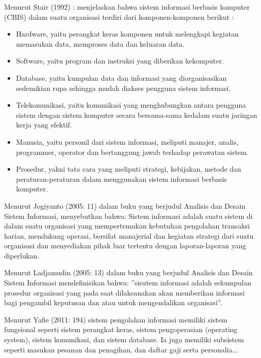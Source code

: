 \documentclass{jtetiproposalskripsi}
\begin{document}
Menurut Stair (1992) : menjelaskan bahwa sistem informasi berbasis komputer (CBIS) dalam suatu organisasi terdiri dari komponen-komponen berikut :
\begin{itemize}
\item Hardware, yaitu perangkat keras komponen untuk melengkapi kegiatan memasukan data, memproses data dan keluaran data.
\item Software, yaitu program dan instruksi yang diberikan kekomputer.
\item Database, yaitu kumpulan data dan informasi yang diorganisasikan sedemikian rupa sehingga mudah diakses pengguna sistem informasi.
\item Telekomunikasi, yaitu komunikasi yang menghubungkan antara pengguna sistem dengan sistem komputer secara bersama-sama kedalam suatu jaringan kerja yang efektif.
\item Manusia, yaitu personil dari sistem informasi, meliputi manajer, analis, programmer, operator dan bertanggung jawab terhadap perawatan sistem.
\item Prosedur, yakni tata cara yang meliputi strategi, kebijakan, metode dan peraturan-peraturan dalam menggunakan sistem informasi berbasis komputer.
\end{itemize}

Menurut Jogiyanto (2005: 11) dalam buku yang berjudul Analisis dan Desain Sistem Informasi, menyebutkan bahwa: Sistem informasi  adalah suatu sistem di dalam suatu organisasi yang mempertemukan kebutuhan pengolahan transaksi harian, mendukung operasi, bersifat manajerial dan kegiatan strategi dari suatu organisasi dan menyediakan pihak luar tertentu dengan laporan-laporan yang diperlukan.

Menurut Ladjamudin (2005: 13) dalam buku yang berjudul Analisis dan Desain Sistem Informasi mendefinisikan bahwa: ”sisutem informasi adalah sekumpulan prosedur organisasi yang pada saat dilaksanakan akan memberikan informasi bagi pengambil keputusan  dan  atau untuk mengendalikan organisasi”.

Menurut Yafie (2011: 194) sistem pengolahan informasi memiliki sistem fungsional seperti sistem perangkat keras, sistem pengoperasian (operating system), sistem komunikasi, dan sistem database. Ia juga memiliki subsistem seperti masukan pesanan dan penagihan, dan daftar gaji serta personalia...
\end{document}
